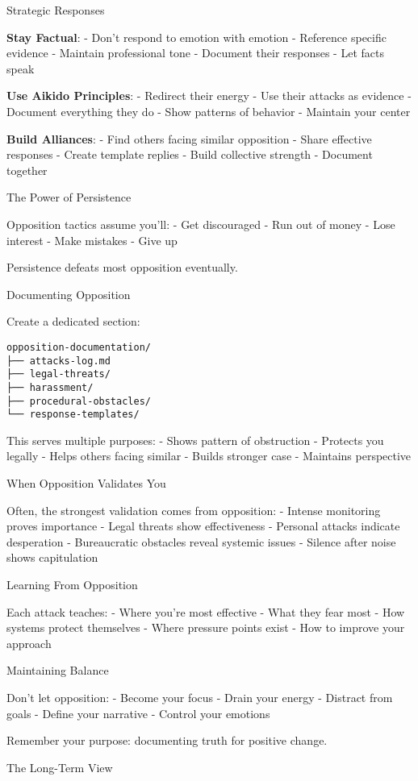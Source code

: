 Strategic Responses

\textbf{Stay Factual}: - Don't respond to emotion with emotion -
Reference specific evidence - Maintain professional tone - Document
their responses - Let facts speak

\textbf{Use Aikido Principles}: - Redirect their energy - Use their
attacks as evidence - Document everything they do - Show patterns of
behavior - Maintain your center

\textbf{Build Alliances}: - Find others facing similar opposition -
Share effective responses - Create template replies - Build collective
strength - Document together

The Power of Persistence

Opposition tactics assume you'll: - Get discouraged - Run out of money -
Lose interest - Make mistakes - Give up

Persistence defeats most opposition eventually.

Documenting Opposition

Create a dedicated section:

\begin{verbatim}
opposition-documentation/
├── attacks-log.md
├── legal-threats/
├── harassment/
├── procedural-obstacles/
└── response-templates/
\end{verbatim}

This serves multiple purposes: - Shows pattern of obstruction - Protects
you legally - Helps others facing similar - Builds stronger case -
Maintains perspective

When Opposition Validates You

Often, the strongest validation comes from opposition: - Intense
monitoring proves importance - Legal threats show effectiveness -
Personal attacks indicate desperation - Bureaucratic obstacles reveal
systemic issues - Silence after noise shows capitulation

Learning From Opposition

Each attack teaches: - Where you're most effective - What they fear most
- How systems protect themselves - Where pressure points exist - How to
improve your approach

Maintaining Balance

Don't let opposition: - Become your focus - Drain your energy - Distract
from goals - Define your narrative - Control your emotions

Remember your purpose: documenting truth for positive change.

The Long-Term View

